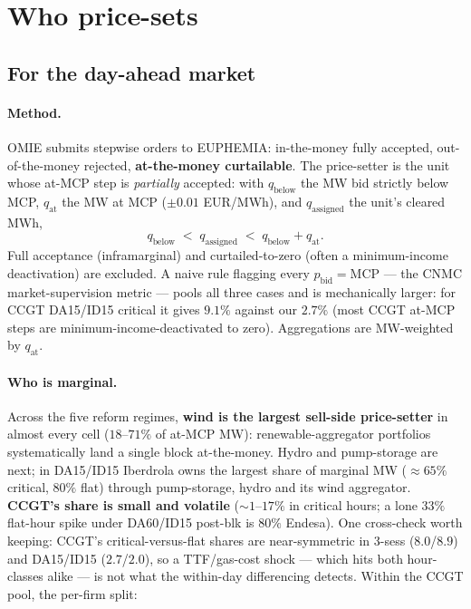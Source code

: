 \documentclass[11pt,a4paper]{article}
\begin{document}
\section{Who price-sets}\label{sec:prov:pricesetter}

\subsection{For the day-ahead market}\label{sec:prov:pricesetter_da}

\paragraph{Method.} OMIE submits stepwise orders to EUPHEMIA: in-the-money fully accepted, out-of-the-money rejected, \textbf{at-the-money curtailable}. The price-setter is the unit whose at-MCP step is \emph{partially} accepted: with $q_{\text{below}}$ the MW bid strictly below MCP, $q_{\text{at}}$ the MW at MCP ($\pm 0.01$ EUR/MWh), and $q_{\text{assigned}}$ the unit's cleared MWh,
\[
 q_{\text{below}} \;<\; q_{\text{assigned}} \;<\; q_{\text{below}} + q_{\text{at}}.
\]
Full acceptance (inframarginal) and curtailed-to-zero (often a minimum-income deactivation) are excluded. A naive rule flagging every $p_{\text{bid}}=\text{MCP}$ --- the CNMC market-supervision metric --- pools all three cases and is mechanically larger: for CCGT DA15/ID15 critical it gives $9.1\%$ against our $2.7\%$ (most CCGT at-MCP steps are minimum-income-deactivated to zero). Aggregations are MW-weighted by $q_{\text{at}}$.

\paragraph{Who is marginal.} Across the five reform regimes, \textbf{wind is the largest sell-side price-setter} in almost every cell ($18$--$71\%$ of at-MCP MW): renewable-aggregator portfolios systematically land a single block at-the-money. Hydro and pump-storage are next; in DA15/ID15 Iberdrola owns the largest share of marginal MW ($\approx 65\%$ critical, $80\%$ flat) through pump-storage, hydro and its wind aggregator. \textbf{CCGT's share is small and volatile} ($\sim\!1$--$17\%$ in critical hours; a lone $33\%$ flat-hour spike under DA60/ID15 post-blk is $80\%$ Endesa). One cross-check worth keeping: CCGT's critical-versus-flat shares are near-symmetric in 3-sess ($8.0$/$8.9$) and DA15/ID15 ($2.7$/$2.0$), so a TTF/gas-cost shock --- which hits both hour-classes alike --- is not what the within-day differencing detects. Within the CCGT pool, the per-firm split:
\end{document}
